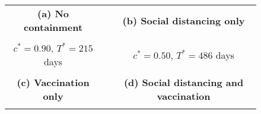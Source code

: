 \documentclass[12pt]{article}
\begin{document}
\begin{figure}[!htb]
\begin{center}%
\begin{tabular}
[c]{ccc}%
\textbf{(a) No containment} &  & \textbf{(b) Social distancing only}\\%
{\includegraphics[
height=1.7781in,
width=2.3609in
]%
{figs/theory_multigroup_L5_dcT_main.png}%
}
&  &
{\includegraphics[
height=1.7781in,
width=2.3609in
]%
{figs/theory_multigroup_L5_dist_dcT_main.png}%
}
\\
$c^{\ast}=0.90$, $T^{\ast}=215$ days &  & $c^{\ast}=0.50$, $T^{\ast}=486$
days\\
&  & \\
\textbf{(c) Vaccination only} &  & \textbf{(d) Social distancing and
vaccination}\\%
{\includegraphics[
height=1.7781in,
width=2.3609in
]%
{figs/theory_multigroup_L5_vacc_dcT_main.png}%
}
&  &

\end{tabular}
\end{center}
\end{figure}
\end{document}
